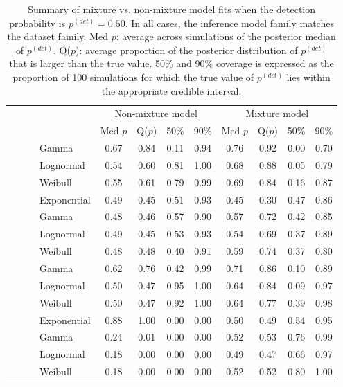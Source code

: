 \documentclass[useAMS,usenatbib,referee,12pt]{article}
\newcommand{\pdet}{p^{(det)}}
\begin{document}
\begin{table}[ht]
\footnotesize\centering
\begin{tabular}{l|l|l|l|cccc|cccc}
 \multicolumn{4}{c|}{ } & \multicolumn{4}{c|}{\underline{Non-mixture model}} & \multicolumn{4}{c}{\underline{Mixture model}} \\
 \multicolumn{4}{c|}{ } & Med $p$ & Q($p$) & 50\% & 90\% & Med $p$ & Q($p$) & 50\% & 90\% \\ 
  \hline
  \hline
 \parbox[t]{2mm}{} & \parbox[t]{2mm}{} & \parbox[t]{2mm}{} & Gamma & 0.67 & 0.84 & 0.11 & 0.94 & 0.76 & 0.92 & 0.00 & 0.70 \\ 
   &  &  & Lognormal & 0.54 & 0.60 & 0.81 & 1.00 & 0.68 & 0.88 & 0.05 & 0.79 \\ 
   &  &  & Weibull & 0.55 & 0.61 & 0.79 & 0.99 & 0.69 & 0.84 & 0.16 & 0.87 \\ 
 & & &  Exponential & 0.49 & 0.45 & 0.51 & 0.93 & 0.45 & 0.30 & 0.47 & 0.86 \\ 
 & & \parbox[t]{2mm}{} & Gamma & 0.48 & 0.46 & 0.57 & 0.90 & 0.57 & 0.72 & 0.42 & 0.85 \\ 
   &  &  & Lognormal & 0.49 & 0.45 & 0.53 & 0.93 & 0.54 & 0.69 & 0.37 & 0.89 \\ 
   &  &  & Weibull & 0.48 & 0.48 & 0.40 & 0.91 & 0.59 & 0.74 & 0.37 & 0.80 \\ 
& \parbox[t]{2mm}{} & \parbox[t]{2mm}{} & Gamma & 0.62 & 0.76 & 0.42 & 0.99 & 0.71 & 0.86 & 0.10 & 0.89 \\ 
   &  &  & Lognormal & 0.50 & 0.47 & 0.95 & 1.00 & 0.64 & 0.84 & 0.09 & 0.97 \\ 
   &  &  & Weibull & 0.50 & 0.47 & 0.92 & 1.00 & 0.64 & 0.77 & 0.39 & 0.98 \\ 
 & & &   Exponential & 0.88 & 1.00 & 0.00 & 0.00 & 0.50 & 0.49 & 0.54 & 0.95 \\ 
 & & \parbox[t]{2mm}{} & Gamma & 0.24 & 0.01 & 0.00 & 0.00 & 0.52 & 0.53 & 0.76 & 0.99 \\ 
   &  &  & Lognormal & 0.18 & 0.00 & 0.00 & 0.00 & 0.49 & 0.47 & 0.66 & 0.97 \\ 
   &  &  & Weibull & 0.18 & 0.00 & 0.00 & 0.00 & 0.52 & 0.52 & 0.80 & 1.00 \\ 
   \hline
\end{tabular}
\caption{Summary of mixture vs. non-mixture model fits when the detection probability is $\pdet =0.50$.  
In all cases, the inference model family matches the dataset family.  
Med $p$: average across simulations of the posterior median of $\pdet$.  
Q($p$): average proportion of the posterior distribution of $\pdet$ that is larger than the true value.  
50\% and 90\% coverage is expressed as the proportion of 100 simulations for which the true value of $\pdet$ lies within the appropriate credible interval.}


\end{table}
\end{document}
